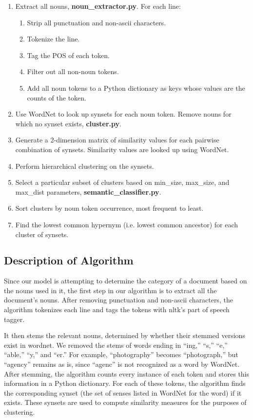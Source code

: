 \documentclass[11pt]{article}
\begin{document}
\begin{enumerate}  
\item Extract all nouns, \textbf{noun\_extractor.py}. For each line:
\begin{enumerate}
\item Strip all punctuation and non-ascii characters.
\item Tokenize the line.
\item Tag the POS of each token.
\item Filter out all non-noun tokens.
\item Add all noun tokens to a Python dictionary as keys whose values are the counts of the token.
\end{enumerate}
\item Use WordNet to look up synsets for each noun token. Remove nouns for which no synset exists, \textbf{cluster.py}.
\item Generate a 2-dimension matrix of similarity values for each pairwise combination of synsets. Similarity values are looked up using WordNet.
\item Perform hierarchical clustering on the synsets.
\item Select a particular subset of clusters based on min\_size, max\_size, and max\_dist parameters, \textbf{semantic\_classifier.py}.
\item Sort clusters by noun token occurrence, most frequent to least.
\item Find the lowest common hypernym (i.e. lowest common ancestor) for each cluster of synsets.
\end{enumerate}

\subsection{Description of Algorithm}

Since our model is attempting to determine the category of a document based on the nouns used in it, the first step in our algorithm is to extract all the document's nouns. After removing punctuation and non-ascii characters, the algorithm tokenizes each line and tags the tokens with nltk's part of speech tagger. 

It then stems the relevant nouns, determined by whether their stemmed versions exist in wordnet. We removed the stems of words ending in ``ing,'' ``s,'' ``e,'' ``able,'' ``y,'' and ``er.'' For example, ``photography'' becomes ``photograph,'' but ``agency'' remains as is, since ``agenc'' is not recognized as a word by WordNet. After stemming, the algorithm counts every instance of each token and stores this information in a Python dictionary. For each of these tokens, the algorithm finds the corresponding synset (the set of senses listed in WordNet for the word) if it exists. These synsets are used to compute similarity measures for the purposes of clustering.
\end{document}
